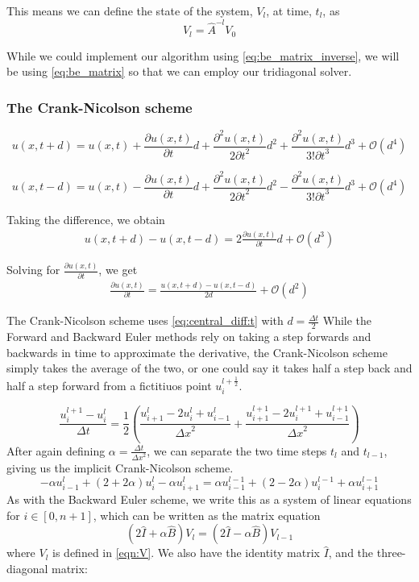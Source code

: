 \documentclass[10pt,a4paper]{article}
\newcommand{\bigO}{{\mathcal{O}}}
\newcommand{\half}{\frac{1}{2}}
\newcommand{\dt}{{\Delta t}}
\newcommand{\dx}{{\Delta x}}
\newcommand{\pt}{{\partial t}}
\newcommand{\pu}{{\partial u}}
\newcommand{\ppu}{{\partial^2 u}}
\begin{document}
This means we can define the state of the system, $V_l$, at time, $t_l$, as
\begin{equation} \label{eq:be_matrix_inverse}
V_l = \hat{A}^{-l}V_0
\end{equation}

While we could implement our algorithm using \ref{eq:be_matrix_inverse}, we will be using \ref{eq:be_matrix} so that we can employ our tridiagonal solver.

\subsubsection{The Crank-Nicolson scheme}
\begin{equation}
u(x, t + d) = u(x,t) + \frac{\pu(x,t)}{\pt}d + \frac{\ppu(x,t)}{2\pt^2}d^2 + \frac{\ppu(x,t)}{3!\pt^3}d^3 + \bigO(d^4)
\end{equation}

\begin{equation}
u(x, t - d) = u(x,t) - \frac{\pu(x,t)}{\pt}d + \frac{\ppu(x,t)}{2\pt^2}d^2 - \frac{\ppu(x,t)}{3!\pt^3}d^3 + \bigO(d^4)
\end{equation}

Taking the difference, we obtain
\begin{align}
u(x, t + d) - u(x, t - d) = 2\frac{\pu(x,t)}{\pt}d + \bigO(d^3)
\end{align}

Solving for $\frac{\pu(x,t)}{\pt}$, we get
\begin{align}
\label{eq:central_diff:t}
\frac{\pu(x,t)}{\pt} = \frac{u(x, t + d) - u(x, t - d)}{2d} + \bigO(d^2)
\end{align}

The Crank-Nicolson scheme uses \ref{eq:central_diff:t} with $d = \frac{\dt}{2}$
While the Forward and Backward Euler methods rely on taking a step forwards and backwards in time to approximate the derivative, the Crank-Nicolson scheme simply takes the average of the two, or one could say it takes half a step back and half a step forward from a fictitiuos point $u_i^{l+\half}$.

\begin{equation}
\frac{u_i^{l+1}-u_i^l}{\dt} = \frac{1}{2}\left( \frac{u_{i+1}^l - 2u_i^l + u_{i-1}^l}{\dx^2} + \frac{u_{i+1}^{l+1} - 2u_i^{l+1} + u_{i-1}^{l+1}}{\dx^2}\right)
\end{equation}
After again defining $\alpha = \frac{\dt}{\dx^2}$, we can separate the two time steps $t_l$ and $t_{l-1}$, giving us the implicit Crank-Nicolson scheme.
\begin{equation}
-\alpha u_{i-1}^l + (2+2\alpha)u_i^l - \alpha u_{i+1}^l = \alpha u_{i-1}^{l-1} + (2-2\alpha)u_i^{l-1} + \alpha u_{i+1}^{l-1}
\end{equation}
As with the Backward Euler scheme, we write this as a system of linear equations for $i \in [0,n+1]$, which can be written as the matrix equation
\begin{equation}\label{eqn:crank}
(2\hat{I}+\alpha \hat{B})V_l = (2\hat{I}-\alpha \hat{B})V_{l-1}
\end{equation}
where $V_l$ is defined in \vref{eqn:V}. We also have the identity matrix $\hat{I}$, and the three-diagonal matrix:
\end{document}
